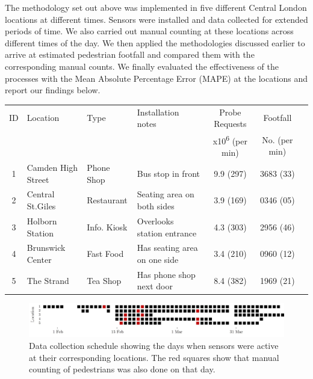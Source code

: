 The methodology set out above was implemented in five different Central London
locations at different times. Sensors were installed and data collected for
extended periods of time. We also carried out manual counting at these locations
across different times of the day. We then applied the methodologies discussed
earlier to arrive at estimated pedestrian footfall and compared them with the
corresponding manual counts.  We finally evaluated the effectiveness of the
processes with the Mean Absolute Percentage Error (MAPE) at the locations and
report our findings below.

\begin{table}
	{\begin{tabular}{clllccc} 
		\toprule
         ID & Location & Type & Installation notes & Probe Requests & Footfall\\
         & & & & x10\textsuperscript{6} (per min) & No. (per min)\\
		 \midrule
         1 & Camden High Street & Phone Shop & Bus stop in front & 9.9 (297) & 3683 (33)\\
         2 & Central St.Giles & Restaurant & Seating area on both sides & 3.9 (169) & 0346 (05)\\
         3 & Holborn Station & Info. Kiosk & Overlooks station entrance & 4.3 (303) & 2956 (46)\\
         4 & Brunswick Center & Fast Food & Has seating area on one side & 3.4 (210) & 0960 (12)\\
         5 & The Strand & Tea Shop & Has phone shop next door & 8.4 (382) & 1969 (21)\\
		 \bottomrule
	\end{tabular}}
	\label{locations-table}
\end{table}

\begin{figure}
	\begin{center}
		\includegraphics [width=0.90\linewidth] {images/main_schedule.jpeg}
		\caption{Data collection schedule showing the days when sensors were active at their corresponding locations. The red squares show that manual counting of pedestrians was also done on that day.}
		\label{main_schedule}
	\end{center}
\end{figure}

